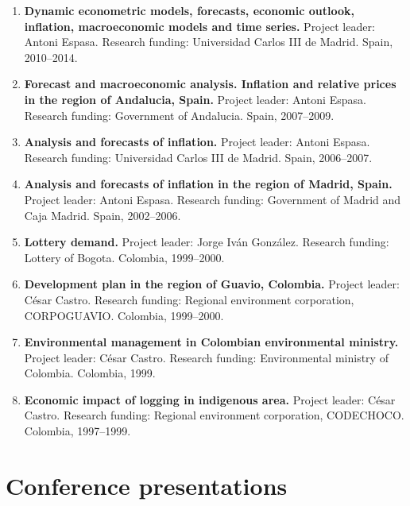 \documentclass[11pt]{article}\usepackage[]{graphicx}\usepackage[]{color}
\begin{document}
\begin{enumerate}

\item \textbf{Dynamic econometric models, forecasts, economic outlook, inflation, macroeconomic models and time series.} Project leader: Antoni Espasa. Research funding: Universidad Carlos III de Madrid. Spain, 2010--2014.

\item \textbf{Forecast and macroeconomic analysis. Inflation and relative prices in the region of Andalucia, Spain.} Project leader: Antoni Espasa. Research funding: Government of Andalucia. Spain, 2007--2009.

\item \textbf{Analysis and forecasts of inflation.} Project leader: Antoni Espasa. Research funding: Universidad Carlos III de Madrid. Spain, 2006--2007.

\item \textbf{Analysis and forecasts of inflation in the region of Madrid, Spain.} Project leader: Antoni Espasa. Research funding: Government of Madrid and Caja Madrid. Spain, 2002--2006.

\item \textbf{Lottery demand.} Project leader: Jorge Iván González. Research funding: Lottery of Bogota. Colombia, 1999--2000.

\item \textbf{Development plan in the region of Guavio, Colombia.} Project leader: César Castro. Research funding: Regional environment corporation, CORPOGUAVIO. Colombia, 1999--2000.

\item \textbf{Environmental management in Colombian environmental ministry.} Project leader: César Castro. Research funding: Environmental ministry of Colombia. Colombia, 1999.

\item \textbf{Economic impact of logging in indigenous area.} Project leader: César Castro. Research funding: Regional environment corporation, CODECHOCO. Colombia, 1997--1999.

\end{enumerate}


\section{Conference presentations} 
\end{document}
